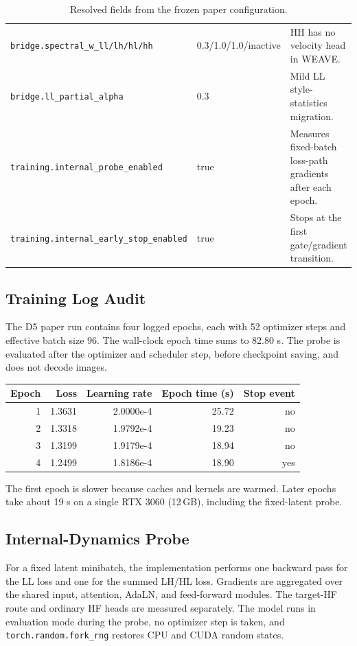 \documentclass[10pt,twocolumn]{article}
\begin{document}
\begin{table}[t]
\begin{tabularx}{\textwidth}{p{}p{}X}
\texttt{bridge.spectral\_w\_ll/lh/hl/hh} & 0.3/1.0/1.0/inactive & HH has no velocity head in WEAVE. \\
\texttt{bridge.ll\_partial\_alpha} & 0.3 & Mild LL style-statistics migration. \\
\texttt{training.internal\_probe\_enabled} & true & Measures fixed-batch loss-path gradients after each epoch. \\
\texttt{training.internal\_early\_stop\_enabled} & true & Stops at the first gate/gradient transition. \\
\bottomrule
\end{tabularx}
\caption{Resolved fields from the frozen paper configuration.}
\label{tab:supp-resolved-config}
\normalsize
\end{table}

\subsection{Training Log Audit}

The D5 paper run contains four logged epochs, each with 52 optimizer steps and effective
batch size 96. The wall-clock epoch time sums to 82.80 s. The probe is evaluated after the
optimizer and scheduler step, before checkpoint saving, and does not decode images.

\begin{center}
\footnotesize
\begin{tabular}{rrrrr}
\toprule
Epoch & Loss & Learning rate & Epoch time (s) & Stop event \\
\midrule
1 & 1.3631 & 2.0000e-4 & 25.72 & no \\
2 & 1.3318 & 1.9792e-4 & 19.23 & no \\
3 & 1.3199 & 1.9179e-4 & 18.94 & no \\
4 & 1.2499 & 1.8186e-4 & 18.90 & yes \\
\bottomrule
\end{tabular}
\normalsize
\end{center}

The first epoch is slower because caches and kernels are warmed. Later epochs take about
19 s on a single RTX 3060 (12\,GB), including the fixed-latent probe.

\subsection{Internal-Dynamics Probe}

For a fixed latent minibatch, the implementation performs one backward pass for the LL
loss and one for the summed LH/HL loss. Gradients are aggregated over the shared input,
attention, AdaLN, and feed-forward modules. The target-HF route and ordinary HF heads are
measured separately. The model runs in evaluation mode during the probe, no optimizer step
is taken, and \texttt{torch.random.fork\_rng} restores CPU and CUDA random states.
\end{document}
